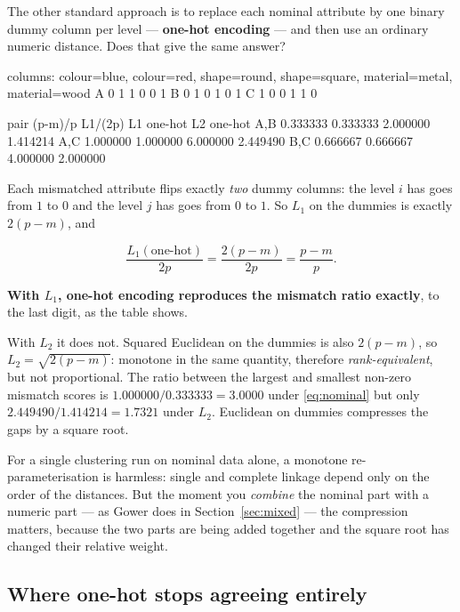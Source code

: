 \documentclass[11pt]{article}
\begin{document}
The other standard approach is to replace each nominal attribute by one
binary dummy column per level --- \textbf{one-hot encoding} --- and then use
an ordinary numeric distance. Does that give the same answer?

\begin{codeout}
columns: colour=blue, colour=red, shape=round, shape=square,
         material=metal, material=wood
  A        0  1  1  0  0  1
  B        0  1  0  1  0  1
  C        1  0  0  1  1  0

pair        (p-m)/p      L1/(2p)   L1 one-hot   L2 one-hot
A,B        0.333333     0.333333     2.000000     1.414214
A,C        1.000000     1.000000     6.000000     2.449490
B,C        0.666667     0.666667     4.000000     2.000000
\end{codeout}

Each mismatched attribute flips exactly \emph{two} dummy columns: the level
$i$ has goes from $1$ to $0$ and the level $j$ has goes from $0$ to $1$. So
$L_1$ on the dummies is exactly $2(p-m)$, and

\begin{equation}
  \frac{L_1(\text{one-hot})}{2p} = \frac{2(p-m)}{2p} = \frac{p-m}{p}.
  \label{eq:onehotl1}
\end{equation}

\textbf{With $L_1$, one-hot encoding reproduces the mismatch ratio exactly},
to the last digit, as the table shows.

With $L_2$ it does not. Squared Euclidean on the dummies is also $2(p-m)$, so
$L_2 = \sqrt{2(p-m)}$: monotone in the same quantity, therefore
\emph{rank-equivalent}, but not proportional. The ratio between the largest
and smallest non-zero mismatch scores is $1.000000/0.333333 = 3.0000$ under
\eqref{eq:nominal} but only $2.449490/1.414214 = 1.7321$ under $L_2$.
Euclidean on dummies compresses the gaps by a square root.

\begin{caution}
For a single clustering run on nominal data alone, a monotone
re-parameterisation is harmless: single and complete linkage depend only on
the order of the distances. But the moment you \emph{combine} the nominal
part with a numeric part --- as Gower does in Section~\ref{sec:mixed} --- the
compression matters, because the two parts are being added together and the
square root has changed their relative weight.
\end{caution}

\subsection{Where one-hot stops agreeing entirely}
\end{document}
